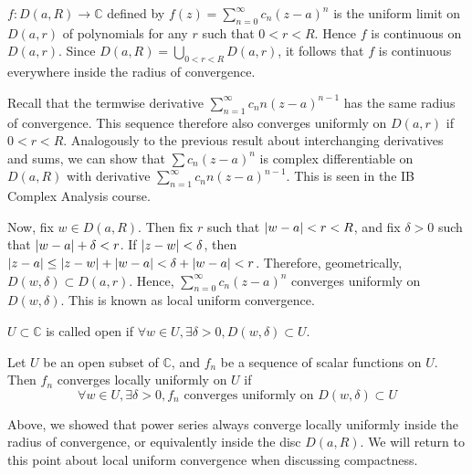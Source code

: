 \begin{remark}
	\( f \colon D(a,R) \to \mathbb C \) defined by \( f(z) = \sum_{n=0}^\infty c_n (z-a)^n \) is the uniform limit on \( D(a,r) \) of polynomials for any \( r \) such that \( 0 < r < R \).
	Hence \( f \) is continuous on \( D(a,r) \).
	Since \( D(a,R) = \bigcup_{0 < r < R} D(a,r) \), it follows that \( f \) is continuous everywhere inside the radius of convergence.

	Recall that the termwise derivative \( \sum_{n=1}^\infty c_n n(z-a)^{n-1} \) has the same radius of convergence.
	This sequence therefore also converges uniformly on \( D(a,r) \) if \( 0 < r < R \).
	Analogously to the previous result about interchanging derivatives and sums, we can show that \( \sum c_n (z-a)^n \) is complex differentiable on \( D(a,R) \) with derivative \( \sum_{n=1}^\infty c_n n(z-a)^{n-1} \).
	This is seen in the IB Complex Analysis course.

	Now, fix \( w \in D(a,R) \).
	Then fix \( r \) such that \( \abs{w-a} < r < R \), and fix \( \delta > 0 \) such that \( \abs{w-a} + \delta < r \).
	If \( \abs{z-w} < \delta \), then \( \abs{z-a} \leq \abs{z-w} + \abs{w-a} < \delta + \abs{w-a} < r \).
	Therefore, geometrically, \( D(w,\delta) \subset D(a,r) \).
	Hence, \( \sum_{n=0}^\infty c_n (z-a)^n \) converges uniformly on \( D(w,\delta) \).
	This is known as local uniform convergence.
\end{remark}
\begin{definition}
	\( U \subset \mathbb C \) is called open if \( \forall w \in U, \exists \delta > 0, D(w,\delta) \subset U \).
\end{definition}
\begin{definition}
	Let \( U \) be an open subset of \( \mathbb C \), and \( f_n \) be a sequence of scalar functions on \( U \).
	Then \( f_n \) converges locally uniformly on \( U \) if
	\[
		\forall w \in U, \exists \delta > 0, f_n \text{ converges uniformly on } D(w,\delta) \subset U
	\]
\end{definition}
\begin{remark}
	Above, we showed that power series always converge locally uniformly inside the radius of convergence, or equivalently inside the disc \( D(a,R) \).
	We will return to this point about local uniform convergence when discussing compactness.
\end{remark}
